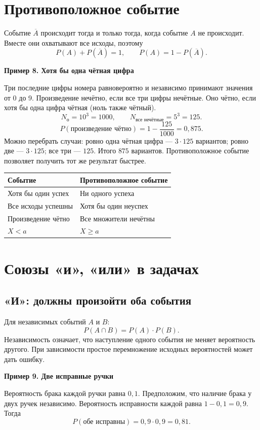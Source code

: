 \documentclass[a4paper,12pt]{article}
\newcommand{\example}[1]{\par\medskip\textcolor{darkaccent}{\textbf{#1}}\par}
\newcommand{\Nall}{N_{\text{о}}}
\begin{document}
\clearpage
\section{Противоположное событие}
Событие $\overline A$ происходит тогда и только тогда, когда событие $A$ не происходит. Вместе они охватывают все исходы, поэтому
\[ P(A)+P(\overline A)=1,\qquad P(A)=1-P(\overline A). \]
\begin{center}
\end{center}
\example{Пример 8. Хотя бы одна чётная цифра}
Три последние цифры номера равновероятно и независимо принимают значения от 0 до 9. Произведение нечётно, если все три цифры нечётные. Оно чётно, если хотя бы одна цифра чётная (ноль также чётный).
\[ \Nall=10^3=1000,\qquad N_{\text{все нечётные}}=5^3=125. \]
\[ P(\text{произведение чётно})=1-\frac{125}{1000}=0,875. \]
Можно перебрать случаи: ровно одна чётная цифра --- $3\cdot125$ вариантов; ровно две --- $3\cdot125$; все три --- $125$. Итого $875$ вариантов. Противоположное событие позволяет получить тот же результат быстрее.
\begin{center}
\begin{tabularx}{\linewidth}{@{}X X@{}}
\toprule
\textbf{Событие} & \textbf{Противоположное событие}\\
\midrule
Хотя бы один успех & Ни одного успеха\\
Все исходы успешны & Хотя бы один неуспех\\
Произведение чётно & Все множители нечётны\\
$X<a$ & $X\ge a$\\
\bottomrule
\end{tabularx}
\end{center}

\clearpage
\section{Союзы «и», «или» в задачах}
\subsection*{«И»: должны произойти оба события}
Для независимых событий $A$ и $B$:
\[ P(A\cap B)=P(A)\cdot P(B). \]
Независимость означает, что наступление одного события не меняет вероятность другого. При зависимости простое перемножение исходных вероятностей может дать ошибку.
\example{Пример 9. Две исправные ручки}
Вероятность брака каждой ручки равна $0,1$. Предположим, что наличие брака у двух ручек независимо. Вероятность исправности каждой равна $1-0,1=0,9$. Тогда
\[ P(\text{обе исправны})=0,9\cdot0,9=0,81. \]
\end{document}
